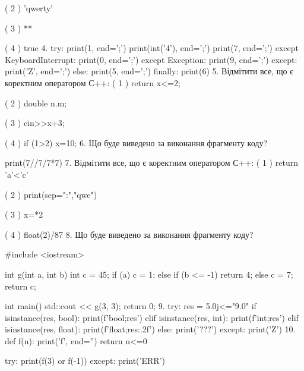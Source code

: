 \documentclass[11pt]{article}
\begin{document}
( 2 ) 'qwerty'

( 3 ) **

( 4 ) true
\vspace{5mm}
4. 
try:
    print(1, end=';')
    print(int('4'), end=';')
    print(7, end=';')
except KeyboardInterrupt:
    print(0, end=';')
except Exception:
    print(9, end=';')
except:
    print('Z', end=';')
else:
    print(5, end=';')
finally:
    print(6)
\vspace{5mm}
5. %
Відмітити все, що є коректним оператором С++:
( 1 ) return x<=2;

( 2 ) double n.m;

( 3 ) cin>>x+3;

( 4 ) if (1>2) x=10;
\vspace{5mm}
6. Що буде виведено за виконання фрагменту коду?

print(7//7/7*7)
\vspace{5mm}
7. %
Відмітити все, що є коректним оператором С++:
( 1 ) return 'a'<'c'

( 2 ) print(sep=":","qwe")

( 3 ) x=*2

( 4 ) float(2)/87
\vspace{5mm}
8. Що буде виведено за виконання фрагменту коду?

#include <iostream>

int g(int a, int b){
    int c = 45;
    if (a)
        c = 1;
    else if (b <= -1)
         return 4;
    else 
        c = 7;
    return c;
}

int main(){
    std::cout << g(3, 3);
    return 0;
}
\vspace{5mm}
9. 
try:
    res = 5.0j<="9.0"
    if isinstance(res, bool):
        print(f'bool;{res}')
    elif isinstance(res, int):
        print(f'int;{res}')
    elif isinstance(res, float):
        print(f'float;{res:.2f}')
    else:
        print('???')
except:
    print('Z')
\vspace{5mm}
10. 
def f(n):
    print('f', end='')
    return n<=0

try:
    print(f(3) or f(-1))
except:
    print('ERR')
\vspace{5mm}










\newpage
\end{document}
